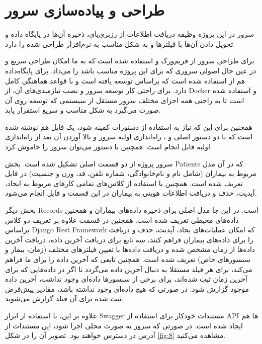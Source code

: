 \section{طراحی و پیاده‌سازی سرور}

سرور در این پروژه وظیفه دریافت اطلاعات از رزبری‌پای،‌ ذخیره آن‌ها در پایگاه داده و تحویل دادن آن‌ها با فیلترها و به شکل مناسب به نرم‌افزار طراحی شده را دارد.

برای طراحی سرور از فریم‌ورک  و  استفاده شده است که به ما امکان طراحی سریع و در عین حال اصولی  سروری که برای این پروژه مناسب باشد را می‌داد. برای پایگاه‌داده هم از  استفاده شده است که براساس  توسعه یافته است و با قواعد  هماهنگی کامل دارد. برای راحتی کار توسعه سرور و نصب نیازمندی‌های آن، از Docker و  استفاده شده است تا به راحتی همه اجزای مختلف سرور مستقل از سیستمی که توسعه روی آن صورت می‌گیرد به شکل مناسب و سریع استقرار یابد.

\lr{}همچنین برای این که نیاز به استفاده از دستورات  کمینه شود، یک فایل   هم نوشته شده است که با دو دستور اصلی  و ، راه‌اندازی اولیه سرور و بالا آوردن آن بعد از راه‌اندازی اولیه قابل انجام است. همچنین با دستور  می‌توان سرور را خاموش کرد.



سرور پروژه از دو قسمت اصلی تشکیل شده است. بخش Patients که در آن مدل مربوط به بیماران (شامل نام و نام‌خانوادگی،‌ شماره تلفن، قد، وزن و جنسیت) در فایل  تعریف شده است. همچنین با استفاده از کلاس‌های  تمامی کار‌های مربوط به ایجاد، آپدیت، حذف و دریافت اطلاعات هویتی به بیماران در این قسمت و فایل  انجام می‌شود.

بخش دیگر Records است. در این جا مدل اصلی برای ذخیره داده‌های بیماران و همچنین داده‌های محیطی تعریف شده است. همچنین در قسمت  علاوه بر تعریف دو کلاس براساس Django Rest Framework که امکان عملیات‌های یجاد، آپدیت، حذف و دریافت را برای داده‌های بیماران فراهم کنند، سه تابع برای دریافت آخرین داده، دریافت آخرین داده‌ها از زمان مشخص شده و دریافت داده‌ها با تعیین فیلتر‌های مختلف (زمان، بیمار و سنسورهای خاص) تعریف شده است. همچنین تابعی که آخرین داده را برای ما فراهم می‌کند، برای هر فیلد مستقلا به دنبال آخرین داده می‌گردد تا اگر در داده‌هایی که برای آخرین زمان ثبت شده‌اند، برای برخی از سنسورها داده‌ای وجود نداشت، آخرین داده موجود گزارش شود. در صورتی که هیچ داده‌ای وجود نداشته باشد، مقادیر پیش‌فرض ثبت شده برای آن فیلد گزارش می‌شوند.

علاوه بر این، با استفاده از ابزار Swagger مستندات خودکار برای استفاده از API ها هم ایجاد شده است. در صورتی که سرور به صورت محلی اجرا شود، این مستندات از آدرس
در دسترس خواهند بود.
 تصویر آن را در شکل \ref{fig:8}
مشاهده می‌کنید.

